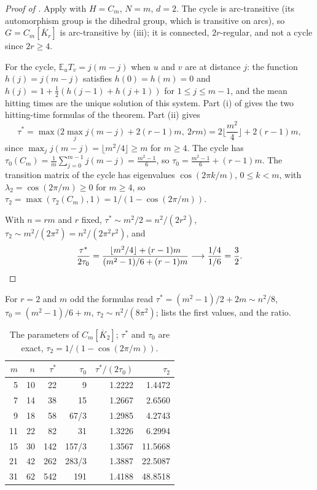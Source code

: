 \documentclass[11pt]{amsart}
\theoremstyle{definition}
\newcommand{\E}{\mathbb{E}}
\newcommand{\Kbar}{\overline{K}}
\begin{document}
\begin{proof}[Proof of ]
Apply  with $H=C_m$, $N=m$, $d=2$. The cycle is arc-transitive (its automorphism group is the dihedral group, which is transitive on arcs), so $G=C_m[\Kbar_r]$ is arc-transitive by (iii); it is connected, $2r$-regular, and not a cycle since $2r\ge4$.

For the cycle, $\E_uT_v=j(m-j)$ when $u$ and $v$ are at distance $j$: the function $h(j)=j(m-j)$ satisfies $h(0)=h(m)=0$ and $h(j)=1+\frac12(h(j-1)+h(j+1))$ for $1\le j\le m-1$, and the mean hitting times are the unique solution of this system. Part (i) of  gives the two hitting-time formulas of the theorem. Part (ii) gives
\[
\tau^*=\max\Big(2\max_j j(m-j)+2(r-1)m,\ 2rm\Big)=2\Big\lfloor\frac{m^2}4\Big\rfloor+2(r-1)m,
\]
since $\max_jj(m-j)=\lfloor m^2/4\rfloor\ge m$ for $m\ge4$. The cycle has $\tau_0(C_m)=\frac1m\sum_{j=0}^{m-1}j(m-j)=\frac{m^2-1}6$, so $\tau_0=\frac{m^2-1}6+(r-1)m$. The transition matrix of the cycle has eigenvalues $\cos(2\pi k/m)$, $0\le k<m$, with $\lambda_2=\cos(2\pi/m)\ge0$ for $m\ge4$, so $\tau_2=\max(\tau_2(C_m),1)=1/(1-\cos(2\pi/m))$.

With $n=rm$ and $r$ fixed, $\tau^*\sim m^2/2=n^2/(2r^2)$, $\tau_2\sim m^2/(2\pi^2)=n^2/(2\pi^2r^2)$, and
\[
\frac{\tau^*}{2\tau_0}=\frac{\lfloor m^2/4\rfloor+(r-1)m}{(m^2-1)/6+(r-1)m}\longrightarrow\frac{1/4}{1/6}=\frac32 .\qedhere
\]
\end{proof}

For $r=2$ and $m$ odd the formulas read $\tau^*=(m^2-1)/2+2m\sim n^2/8$, $\tau_0=(m^2-1)/6+m$, $\tau_2\sim n^2/(8\pi^2)$;  lists the first values, and  the ratio.

\begin{table}[ht]
\centering
\begin{tabular}{rrrrrr}
\toprule
$m$ & $n$ & $\tau^*$ & $\tau_0$ & $\tau^*/(2\tau_0)$ & $\tau_2$\\
\midrule
5 & 10 & 22 & 9 & 1.2222 & 1.4472\\
7 & 14 & 38 & 15 & 1.2667 & 2.6560\\
9 & 18 & 58 & 67/3 & 1.2985 & 4.2743\\
11 & 22 & 82 & 31 & 1.3226 & 6.2994\\
15 & 30 & 142 & 157/3 & 1.3567 & 11.5668\\
21 & 42 & 262 & 283/3 & 1.3887 & 22.5087\\
31 & 62 & 542 & 191 & 1.4188 & 48.8518\\
\bottomrule
\end{tabular}
\caption{The parameters of $C_m[\Kbar_2]$; $\tau^*$ and $\tau_0$ are exact, $\tau_2=1/(1-\cos(2\pi/m))$.}
\label{tab:values}
\end{table}
\end{document}
